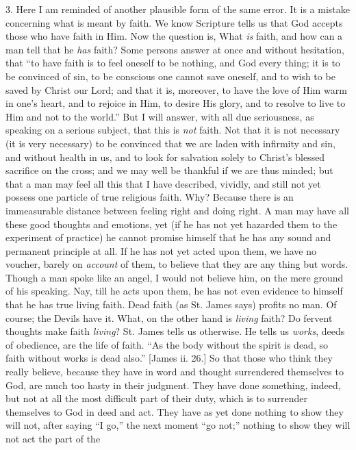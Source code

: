 3. Here I am reminded of another plausible form of the
same error. It is a mistake concerning what is meant by
faith. We know Scripture tells us that God accepts those
who have faith in Him. Now the question is, What \emph{is}
faith, and how can a man tell that he \emph{has} faith?
Some persons answer at once and without hesitation, that
``to have faith is to feel oneself to be nothing, and
God every thing; it is to be convinced of sin, to be
conscious one cannot save oneself, and to wish to be
saved by Christ our Lord; and that it is, moreover, to
have the love of Him warm in one's heart, and to rejoice
in Him, to desire His glory, and to resolve to live to
Him and not to the world.'' But I will answer, with
all due seriousness, as speaking on a serious subject, that this is \emph{not} faith. Not that it is not
necessary (it is very necessary) to be convinced that we
are laden with infirmity and sin, and without health in
us, and to look for salvation solely to Christ's blessed
sacrifice on the cross; and we may well be thankful if we
are thus minded; but that a man may feel all this that I
have described, vividly, and still not yet possess one
particle of true religious faith. Why? Because there is
an immeasurable distance between feeling right and doing
right. A man may have all these good thoughts and
emotions, yet (if he has not yet hazarded them to the
experiment of practice) he cannot promise himself that he
has any sound and permanent principle at all. If he has
not yet acted upon them, we have no voucher, barely on \emph{account}
of them, to believe that they are any thing but words.
Though a man spoke like an angel, I would not believe
him, on the mere ground of his speaking. Nay, till he
acts upon them, he has not even evidence to himself that
he has true living faith. Dead faith (as St. James says)
profits no man. Of course; the Devils have it. What, on
the other hand is \emph{living} faith? Do fervent
thoughts make faith \emph{living}? St. James tells us
otherwise. He tells us \emph{works}, deeds of obedience,
are the life of faith. ``As the body without the
spirit is dead, so faith without works is dead
also.'' [James ii. 26.] So that those who think they
really believe, because they have in word and thought
surrendered themselves to God, are much too hasty in
their judgment. They have done something, indeed, but not
at all the most difficult part of their duty, which is to
surrender themselves to God in deed and act. They have as
yet done nothing to show they will not, after saying
``I go,'' the next moment ``go not;''
nothing to show they will not act the part of the
